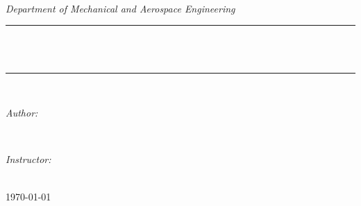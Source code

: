 \begin{titlepage}
	\newcommand{\HRule}{\rule{\linewidth}{0.5mm}}
	
	\begin{figure}
		\centering
		\\[1cm]
	\end{figure}
	
	\center 
	\quad\\[1.5cm]
	\textsl{\Large \coursenumber\ \textemdash\ \coursename}\\[0.5cm] 
	\textsl{\large Department of Mechanical and Aerospace Engineering}\\[0.5cm] 
	\makeatletter
	\HRule \\[0.4cm]
	{ \huge \bfseries \@title}\\[0.4cm] 
	\HRule \\[1.5cm]
	\begin{minipage}{0.4\textwidth}
		\begin{flushleft} \large
			\emph{Author:}\\
			\@author 
		\end{flushleft}
	\end{minipage}
	~
	\begin{minipage}{0.4\textwidth}
		\begin{flushright} \large
			\emph{Instructor:} \\
			\textup{\instructor}
		\end{flushright}
	\end{minipage}\\[3cm]
	\makeatother
	\vfill
	{\large \today}\\[2cm]
	\vfill 
\end{titlepage}